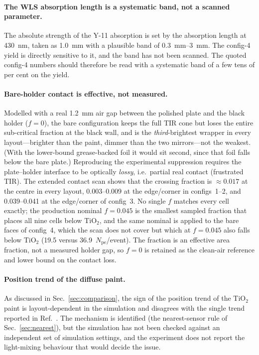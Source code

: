 \documentclass[11pt,a4paper]{article}
\newcommand{\pe}{\ensuremath{N_{\mathrm{pe}}}}
\begin{document}
\paragraph{The WLS absorption length is a systematic band, not a scanned
parameter.}
The absolute strength of the Y-11 absorption is set by the absorption length
at \SI{430}{\nano\meter}, taken as \SI{1.0}{\milli\meter} with a plausible band
of \SIrange{0.3}{3}{\milli\meter}. The config-4 yield is directly sensitive to
it, and the band has not been scanned. The quoted config-4 numbers should
therefore be read with a systematic band of a few tens of per cent on the
yield.

\paragraph{Bare-holder contact is effective, not measured.}
Modelled with a real \SI{1.2}{\milli\meter} air gap between the polished plate
and the black holder ($f=0$), the bare configuration keeps the full TIR cone
but loses the entire sub-critical fraction at the black wall, and is the
\emph{third}-brightest wrapper in every layout---brighter than the paint,
dimmer than the two mirrors---not the weakest. (With the lower-bound
grease-backed foil it would sit second, since that foil falls below the bare
plate.) Reproducing
the experimental suppression requires the plate--holder
interface to be optically \emph{lossy}, i.e.\ partial real contact (frustrated
TIR). The extended contact scan shows that the crossing fraction is
$\approx\num{0.017}$ at the centre in every layout, \num{0.003}--\num{0.009} at
the edge/corner in configs~1--2, and \num{0.039}--\num{0.041} at the edge/corner
of config~3. No single $f$ matches every cell exactly; the production nominal
$f=\num{0.045}$ is the smallest sampled fraction that places all nine cells
below TiO$_2$, and the same nominal is applied to the bare faces of config~4,
which the scan does not cover but which at $f=\num{0.045}$ also falls below
TiO$_2$ (\num{19.5} versus \num{36.9}~\pe/event). The fraction is an effective
area fraction, not a measured holder gap, so $f=0$ is retained as the clean-air
reference and lower bound on the contact loss.

\paragraph{Position trend of the diffuse paint.}
As discussed in Sec.~\ref{sec:comparison}, the sign of the position trend of
the TiO$_2$ paint is layout-dependent in the simulation and disagrees with the
single trend reported in Ref.~\cite{Rao2025}. The mechanism is identified
(the nearest-sensor rule of Sec.~\ref{sec:nearest}), but the simulation has not
been checked against an independent set of simulation settings, and the
experiment does not report the light-mixing behaviour that would decide the
issue.
\end{document}
